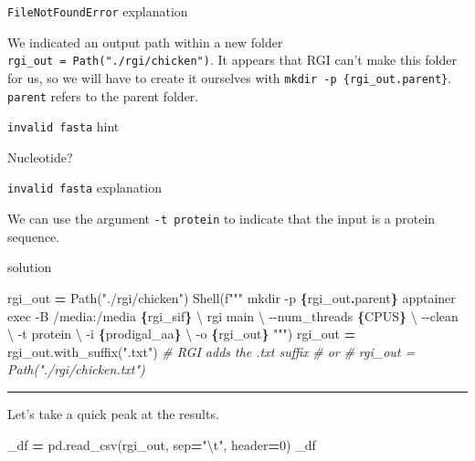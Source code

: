 \documentclass[
]{book}
\newenvironment{Shaded}{\begin{snugshade}}{\end{snugshade}}
\newcommand{\CharTok}[1]{\textcolor[rgb]{0.31,0.60,0.02}{#1}}
\newcommand{\CommentTok}[1]{\textcolor[rgb]{0.56,0.35,0.01}{\textit{#1}}}
\newcommand{\DecValTok}[1]{\textcolor[rgb]{0.00,0.00,0.81}{#1}}
\newcommand{\NormalTok}[1]{#1}
\newcommand{\OperatorTok}[1]{\textcolor[rgb]{0.81,0.36,0.00}{\textbf{#1}}}
\newcommand{\SpecialCharTok}[1]{\textcolor[rgb]{0.81,0.36,0.00}{\textbf{#1}}}
\newcommand{\SpecialStringTok}[1]{\textcolor[rgb]{0.31,0.60,0.02}{#1}}
\newcommand{\StringTok}[1]{\textcolor[rgb]{0.31,0.60,0.02}{#1}}
\begin{document}
\texttt{FileNotFoundError} explanation

We indicated an output path within a new folder \texttt{rgi\_out\ =\ Path("./rgi/chicken")}. It appears that RGI can't make this folder for us,
so we will have to create it ourselves with \texttt{mkdir\ -p\ \{rgi\_out.parent\}}. \texttt{parent} refers to the parent folder.

\texttt{invalid\ fasta} hint

Nucleotide?

\texttt{invalid\ fasta} explanation

We can use the argument \texttt{-t\ protein} to indicate that the input is a protein sequence.

solution

\begin{Shaded}
\begin{Highlighting}[numbers=left,,]
\NormalTok{rgi\_out }\OperatorTok{=}\NormalTok{ Path(}\StringTok{"./rgi/chicken"}\NormalTok{)}
\NormalTok{Shell(}\SpecialStringTok{f"""}
\SpecialStringTok{mkdir {-}p }\SpecialCharTok{\{}\NormalTok{rgi\_out}\SpecialCharTok{.}\NormalTok{parent}\SpecialCharTok{\}}
\SpecialStringTok{apptainer exec {-}B /media:/media }\SpecialCharTok{\{}\NormalTok{rgi\_sif}\SpecialCharTok{\}}\SpecialStringTok{ }\CharTok{\textbackslash{}}
\SpecialStringTok{    rgi main }\CharTok{\textbackslash{}}
\SpecialStringTok{        {-}{-}num\_threads }\SpecialCharTok{\{}\NormalTok{CPUS}\SpecialCharTok{\}}\SpecialStringTok{ }\CharTok{\textbackslash{}}
\SpecialStringTok{        {-}{-}clean }\CharTok{\textbackslash{}}
\SpecialStringTok{        {-}t protein }\CharTok{\textbackslash{}}
\SpecialStringTok{        {-}i }\SpecialCharTok{\{}\NormalTok{prodigal\_aa}\SpecialCharTok{\}}\SpecialStringTok{ }\CharTok{\textbackslash{}}
\SpecialStringTok{        {-}o }\SpecialCharTok{\{}\NormalTok{rgi\_out}\SpecialCharTok{\}}
\SpecialStringTok{"""}\NormalTok{)}
\NormalTok{rgi\_out }\OperatorTok{=}\NormalTok{ rgi\_out.with\_suffix(}\StringTok{".txt"}\NormalTok{) }\CommentTok{\# RGI adds the .txt suffix}
\CommentTok{\# or}
\CommentTok{\# rgi\_out = Path("./rgi/chicken.txt")}
\end{Highlighting}
\end{Shaded}

\begin{center}\rule{0.5\linewidth}{0.5pt}\end{center}

Let's take a quick peak at the results.

\begin{Shaded}
\begin{Highlighting}[numbers=left,,]
\NormalTok{\_df }\OperatorTok{=}\NormalTok{ pd.read\_csv(rgi\_out, sep}\OperatorTok{=}\StringTok{"}\CharTok{\textbackslash{}t}\StringTok{"}\NormalTok{, header}\OperatorTok{=}\DecValTok{0}\NormalTok{)}
\NormalTok{\_df}
\end{Highlighting}
\end{Shaded}
\end{document}

